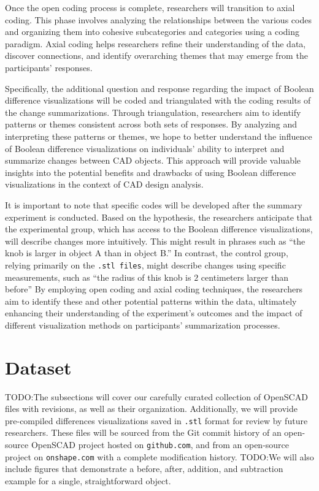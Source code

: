 \documentclass[sigconf,authorversion,nonacm]{acmart}
\begin{document}
Once the open coding process is complete, researchers will transition to axial coding. This phase involves analyzing the relationships between the various codes and organizing them into cohesive subcategories and categories using a coding paradigm.
Axial coding helps researchers refine their understanding of the data, discover connections, and identify overarching themes that may emerge from the participants' responses.

Specifically, the additional question and response regarding the impact of Boolean difference visualizations will be coded and triangulated with the coding results of the change summarizations.
Through triangulation, researchers aim to identify patterns or themes consistent across both sets of responses. By analyzing and interpreting these patterns or themes, we hope to better understand the influence of Boolean difference visualizations on individuals' ability to interpret and summarize changes between CAD objects.
This approach will provide valuable insights into the potential benefits and drawbacks of using Boolean difference visualizations in the context of CAD design analysis.

It is important to note that specific codes will be developed after the summary experiment is conducted. Based on the hypothesis, the researchers anticipate that the experimental group,
which has access to the Boolean difference visualizations, will describe changes more intuitively. This might result in phrases such as ``the knob is larger in object A than in object B.''
In contrast, the control group, relying primarily on the \texttt{.stl files}, might describe changes using specific measurements, such as ``the radius of this knob is $2$ centimeters larger than before''
By employing open coding and axial coding techniques, the researchers aim to identify these and other potential patterns within the data, ultimately enhancing their understanding of the experiment's outcomes and the impact of different visualization methods on participants' summarization processes.


\section{Dataset}

TODO:The subsections will cover our carefully curated collection of OpenSCAD files with revisions, as well as their organization. Additionally, we will provide pre-compiled differences visualizations saved in \texttt{.stl} format for review by future researchers. These files will be sourced from the Git commit history of an open-source OpenSCAD project hosted on \texttt{github.com}, and from an open-source project on \texttt{onshape.com} with a complete modification history.
TODO:We will also include figures that demonstrate a before, after, addition, and subtraction example for a single, straightforward object.
\end{document}
